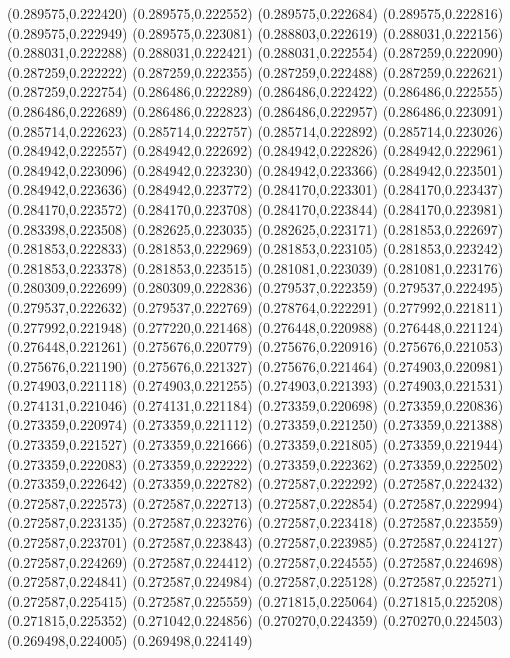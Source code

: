 (0.289575,0.222420)
(0.289575,0.222552)
(0.289575,0.222684)
(0.289575,0.222816)
(0.289575,0.222949)
(0.289575,0.223081)
(0.288803,0.222619)
(0.288031,0.222156)
(0.288031,0.222288)
(0.288031,0.222421)
(0.288031,0.222554)
(0.287259,0.222090)
(0.287259,0.222222)
(0.287259,0.222355)
(0.287259,0.222488)
(0.287259,0.222621)
(0.287259,0.222754)
(0.286486,0.222289)
(0.286486,0.222422)
(0.286486,0.222555)
(0.286486,0.222689)
(0.286486,0.222823)
(0.286486,0.222957)
(0.286486,0.223091)
(0.285714,0.222623)
(0.285714,0.222757)
(0.285714,0.222892)
(0.285714,0.223026)
(0.284942,0.222557)
(0.284942,0.222692)
(0.284942,0.222826)
(0.284942,0.222961)
(0.284942,0.223096)
(0.284942,0.223230)
(0.284942,0.223366)
(0.284942,0.223501)
(0.284942,0.223636)
(0.284942,0.223772)
(0.284170,0.223301)
(0.284170,0.223437)
(0.284170,0.223572)
(0.284170,0.223708)
(0.284170,0.223844)
(0.284170,0.223981)
(0.283398,0.223508)
(0.282625,0.223035)
(0.282625,0.223171)
(0.281853,0.222697)
(0.281853,0.222833)
(0.281853,0.222969)
(0.281853,0.223105)
(0.281853,0.223242)
(0.281853,0.223378)
(0.281853,0.223515)
(0.281081,0.223039)
(0.281081,0.223176)
(0.280309,0.222699)
(0.280309,0.222836)
(0.279537,0.222359)
(0.279537,0.222495)
(0.279537,0.222632)
(0.279537,0.222769)
(0.278764,0.222291)
(0.277992,0.221811)
(0.277992,0.221948)
(0.277220,0.221468)
(0.276448,0.220988)
(0.276448,0.221124)
(0.276448,0.221261)
(0.275676,0.220779)
(0.275676,0.220916)
(0.275676,0.221053)
(0.275676,0.221190)
(0.275676,0.221327)
(0.275676,0.221464)
(0.274903,0.220981)
(0.274903,0.221118)
(0.274903,0.221255)
(0.274903,0.221393)
(0.274903,0.221531)
(0.274131,0.221046)
(0.274131,0.221184)
(0.273359,0.220698)
(0.273359,0.220836)
(0.273359,0.220974)
(0.273359,0.221112)
(0.273359,0.221250)
(0.273359,0.221388)
(0.273359,0.221527)
(0.273359,0.221666)
(0.273359,0.221805)
(0.273359,0.221944)
(0.273359,0.222083)
(0.273359,0.222222)
(0.273359,0.222362)
(0.273359,0.222502)
(0.273359,0.222642)
(0.273359,0.222782)
(0.272587,0.222292)
(0.272587,0.222432)
(0.272587,0.222573)
(0.272587,0.222713)
(0.272587,0.222854)
(0.272587,0.222994)
(0.272587,0.223135)
(0.272587,0.223276)
(0.272587,0.223418)
(0.272587,0.223559)
(0.272587,0.223701)
(0.272587,0.223843)
(0.272587,0.223985)
(0.272587,0.224127)
(0.272587,0.224269)
(0.272587,0.224412)
(0.272587,0.224555)
(0.272587,0.224698)
(0.272587,0.224841)
(0.272587,0.224984)
(0.272587,0.225128)
(0.272587,0.225271)
(0.272587,0.225415)
(0.272587,0.225559)
(0.271815,0.225064)
(0.271815,0.225208)
(0.271815,0.225352)
(0.271042,0.224856)
(0.270270,0.224359)
(0.270270,0.224503)
(0.269498,0.224005)
(0.269498,0.224149)
